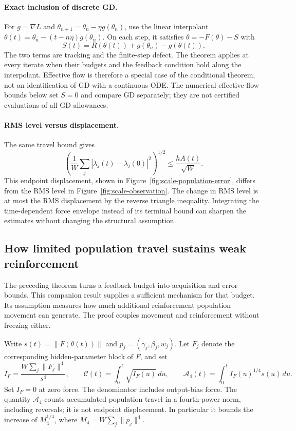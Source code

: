 \paragraph{Exact inclusion of discrete GD.}
For $g=\nabla L$ and $\theta_{n+1}=\theta_n-\eta g(\theta_n)$, use the
linear interpolant $\theta(t)=\theta_n-(t-n\eta)g(\theta_n)$. On each step,
it satisfies $\dot\theta=-F(\theta)-S$ with
\begin{equation}
S(t)=R(\theta(t))+g(\theta_n)-g(\theta(t)).
\label{eq:scale-gd-defect}
\end{equation}
The two terms are tracking and the finite-step defect. The theorem applies
at every iterate when their budgets and the feedback condition hold along
the interpolant. Effective flow is therefore a special case of the
conditional theorem, not an identification of GD with a continuous ODE.
The numerical effective-flow bounds below set $S=0$ and compare GD
separately; they are not certified evaluations of all GD allowances.

\paragraph{RMS level versus displacement.}
The same travel bound gives
\begin{equation}
\left(\frac1W\sum_j|\lambda_j(t)-\lambda_j(0)|^2\right)^{1/2}
\le\frac{hA(t)}{\sqrt W}.
\label{eq:scale-displacement}
\end{equation}
This endpoint displacement, shown in Figure~\ref{fig:scale-population-error},
differs from the RMS level in Figure~\ref{fig:scale-observation}.
The change in RMS level is at most the RMS displacement by the reverse
triangle inequality. Integrating the time-dependent force envelope instead
of its terminal bound can sharpen the estimates without changing the
structural assumption.

\subsection{How limited population travel sustains weak reinforcement}
\label{app:scale-loop}

The preceding theorem turns a feedback budget into acquisition and error
bounds. This companion result supplies a sufficient mechanism for that
budget. Its assumption measures how much additional reinforcement
population movement can generate. The proof couples movement and
reinforcement without freezing either.

Write $s(t)=\|F(\theta(t))\|$ and $p_j=(\gamma_j,\beta_j,w_j)$.
Let $F_j$ denote the corresponding hidden-parameter block of $F$, and set
\begin{equation}
I_F=\frac{W\sum_j\|F_j\|^4}{s^4},\qquad
\mathcal C(t)=\int_0^t\sqrt{I_F(u)}\,du,\qquad
\mathcal A_4(t)=\int_0^t I_F(u)^{1/4}s(u)\,du.
\label{eq:scale-loop-travel}
\end{equation}
Set $I_F=0$ at zero force. The denominator includes output-bias force.
The quantity $\mathcal A_4$ counts accumulated population travel in a
fourth-power norm, including reversals; it is not endpoint displacement.
In particular it bounds the increase of
$M_4^{1/4}$, where $M_4=W\sum_j\|p_j\|^4$.

